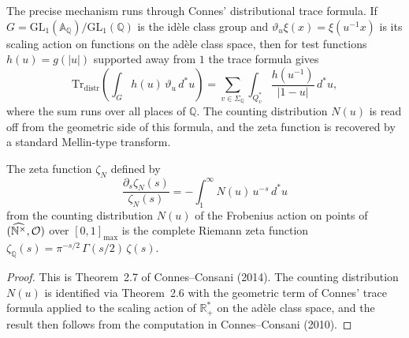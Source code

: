 The precise mechanism runs through Connes' distributional trace formula.
If $G = \mathrm{GL}_1(\mathbb{A}_{\mathbb{Q}})/\mathrm{GL}_1(\mathbb{Q})$
is the id\`ele class group and $\vartheta_u\xi(x) = \xi(u^{-1}x)$ is
its scaling action on functions on the ad\`ele class space, then for
test functions $h(u) = g(|u|)$ supported away from $1$ the trace
formula gives
\[
  \mathrm{Tr}_{\mathrm{distr}}\!\left(\int_G h(u)\,\vartheta_u\,d^*u\right)
  = \sum_{v \in \Sigma_{\mathbb{Q}}} \int_{Q_v^*}
    \frac{h(u^{-1})}{|1-u|}\,d^*u,
\]
where the sum runs over all places of $\mathbb{Q}$.  The counting
distribution $N(u)$ is read off from the geometric side of this formula,
and the zeta function is recovered by a standard Mellin-type transform.

\begin{theorem}[label=thm:zeta_counting,
               uses=thm:frobenius_are_correspondences]
  \label{thm:zeta_counting}
  The zeta function $\zeta_N$ defined by
  \[
    \frac{\partial_s \zeta_N(s)}{\zeta_N(s)}
    = -\int_1^\infty N(u)\,u^{-s}\,d^*u
  \]
  from the counting distribution $N(u)$ of the Frobenius action on
  points of $(\widehat{\mathbb{N}^{\times}}, \mathcal{O})$ over $[0,1]_{\max}$ is the
  complete Riemann zeta function
  $\zeta_{\mathbb{Q}}(s) = \pi^{-s/2}\,\Gamma(s/2)\,\zeta(s)$.
\end{theorem}
\begin{proof}
  This is Theorem~2.7 of Connes--Consani (2014).  The counting
  distribution $N(u)$ is identified via Theorem~2.6 with the geometric
  term of Connes' trace formula applied to the scaling action of
  $\mathbb{R}^*_+$ on the ad\`ele class space, and the result then
  follows from the computation in Connes--Consani (2010).  \sorry
\end{proof}